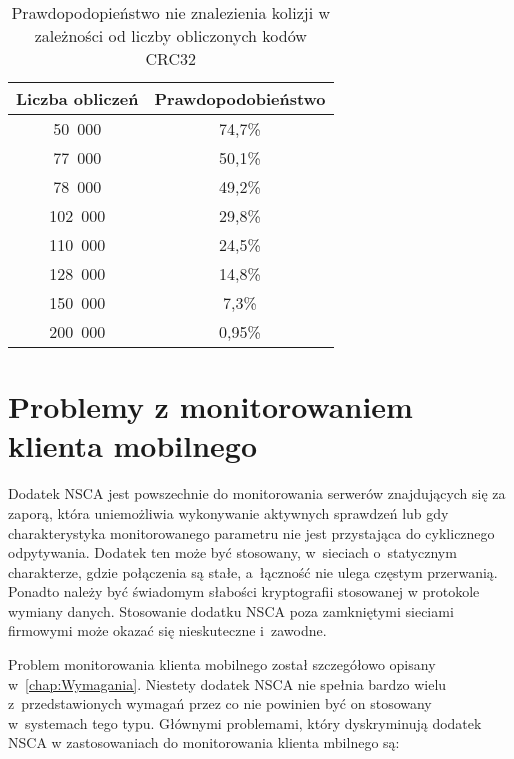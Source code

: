 \begin{table}
\centering
\caption{Prawdopodopieństwo nie znalezienia kolizji w zależności od
  liczby obliczonych kodów CRC32}
\label{tab:CRC32Colisions}
\begin{tabular}{|c|c|}
\hline
Liczba obliczeń & Prawdopodobieństwo \\
\hline
50~000 & 74,7\% \\
\hline
77~000 & 50,1\% \\
\hline
78~000 & 49,2\% \\
\hline
102~000 & 29,8\% \\
\hline
110~000 & 24,5\% \\
\hline
128~000 & 14,8\% \\
\hline
150~000 & 7,3\% \\
\hline
200~000 & 0,95\% \\
\hline
\end{tabular}
\end{table} 

\section[Problemy][Problemy z monitorowaniem klienta mobilnego]{Problemy z monitorowaniem klienta mobilnego}

Dodatek NSCA jest powszechnie do monitorowania serwerów znajdujących
się za zaporą, która uniemożliwia wykonywanie aktywnych sprawdzeń lub
gdy charakterystyka monitorowanego parametru nie jest przystająca do
cyklicznego odpytywania. Dodatek ten może być stosowany, w~sieciach
o~statycznym charakterze, gdzie połączenia są stałe, a~łączność nie
ulega częstym przerwanią. Ponadto należy być świadomym słabości
kryptografii stosowanej w protokole wymiany danych. Stosowanie dodatku
NSCA poza zamkniętymi sieciami firmowymi może okazać się nieskuteczne
i~zawodne.

Problem monitorowania klienta mobilnego został szczegółowo opisany
w~\ref{chap:Wymagania}. Niestety dodatek NSCA nie spełnia bardzo wielu
z~przedstawionych wymagań przez co nie powinien być on stosowany
w~systemach tego typu. Głównymi problemami, który dyskryminują dodatek
NSCA w zastosowaniach do monitorowania klienta mbilnego są:

